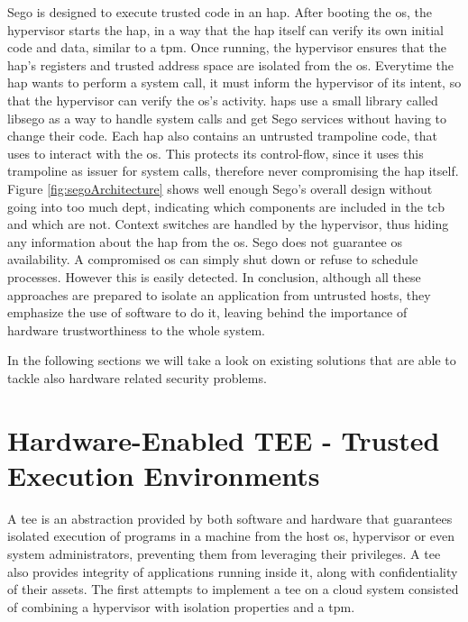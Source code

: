 Sego is designed to execute trusted code in an \gls{hap}.
After booting the \gls{os}, the hypervisor starts the \gls{hap}, in a way that the \gls{hap} itself can verify its own initial code and data, similar to a \gls{tpm}.
Once running, the hypervisor ensures that the \gls{hap}’s registers and trusted address space are isolated from the \gls{os}. Everytime the \gls{hap} wants to perform a system call, it must inform
the hypervisor of its intent, so that the hypervisor can verify the \gls{os}'s activity. \gls{hap}s use a
small library called libsego as a way to handle system calls and get Sego services without having to change their code. Each \gls{hap} also contains an untrusted trampoline code, that
uses to interact with the \gls{os}. This protects its control-flow, since it uses this trampoline as issuer for system calls, therefore never compromising the \gls{hap} itself. Figure \ref{fig:segoArchitecture} shows well enough Sego’s overall design without going into too much dept, indicating which components are included in the \gls{tcb} and which are not.
Context switches are handled by the hypervisor, thus hiding any information about the \gls{hap} from the \gls{os}.
Sego does not guarantee \gls{os} availability. A compromised \gls{os} can simply shut down or refuse to schedule processes. However this is easily detected.
In conclusion, although all these approaches are prepared to isolate an application from untrusted hosts, they emphasize the use of software to do it, leaving behind the importance of hardware trustworthiness to the whole system.

In the following sections we will take a look on existing solutions that are able to tackle also hardware related security problems.

\section{Hardware-Enabled TEE - Trusted Execution Environments}
\label{sec:tpm_hsm_tees}

A \gls{tee} is an abstraction provided by both software and hardware that guarantees isolated execution of programs in a machine from the host \gls{os}, hypervisor or even system administrators, preventing them from leveraging their privileges. A \gls{tee} also provides integrity of applications running inside it, along with confidentiality of their assets.
The first attempts to implement a \gls{tee} on a cloud system consisted of combining a hypervisor with isolation properties and a \gls{tpm}. 

